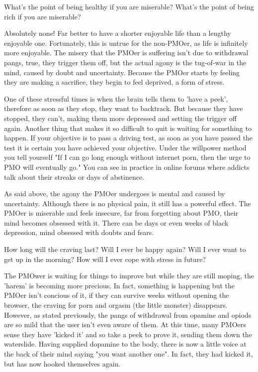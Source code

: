 \documentclass[easypeasy.tex]{subfiles}
\begin{document}
  What's the point of being healthy if you are miserable?
  What's the point of being rich if you are miserable?

Absolutely none! Far better to have a shorter enjoyable life than a lengthy enjoyable one. Fortunately, this is untrue for the non-PMOer, as life is infinitely more enjoyable. The misery that the PMOer is suffering isn't due to withdrawal pangs, true, they trigger them off, but the actual agony is the tug-of-war in the mind, caused by doubt and uncertainty. Because the PMOer starts by feeling they are making a sacrifice, they begin to feel deprived, a form of stress.

One of these stressful times is when the brain tells them to 'have a peek', therefore as soon as they stop, they want to backtrack. But because they have stopped, they can't, making them more depressed and setting the trigger off again. Another thing that makes it so difficult to quit is waiting for something to happen. If your objective is to pass a driving test, as soon as you have passed the test it is certain you have achieved your objective. Under the willpower method you tell yourself "If I can go long enough without internet porn, then the urge to PMO will eventually go." You can see in practice in online forums where addicts talk about their streaks or days of abstinence.

As said above, the agony the PMOer undergoes is mental and caused by uncertainty. Although there is no physical pain, it still has a powerful effect. The PMOer is miserable and feels insecure, far from forgetting about PMO, their mind becomes obsessed with it. There can be days or even weeks of black depression, mind obsessed with doubts and fears.

  How long will the craving last?
  Will I ever be happy again?
  Will I ever want to get up in the morning?
  How will I ever cope with stress in future?

The PMOwer is waiting for things to improve but while they are still moping, the 'harem' is becoming more precious. In fact, something is happening but the PMOer isn't concious of it, if they can survive weeks without opening the browser, the craving for porn and orgasm (the little monster) disappears. However, as stated previously, the pangs of withdrawal from opamine and opiods are so mild that the user isn't even aware of them. At this time, many PMOers sense they have 'kicked it' and so take a peek to prove it, sending them down the waterslide. Having supplied dopamine to the body, there is now a little voice at the back of their mind saying "you want another one". In fact, they had kicked it, but has now hooked themselves again.
\end{document}
